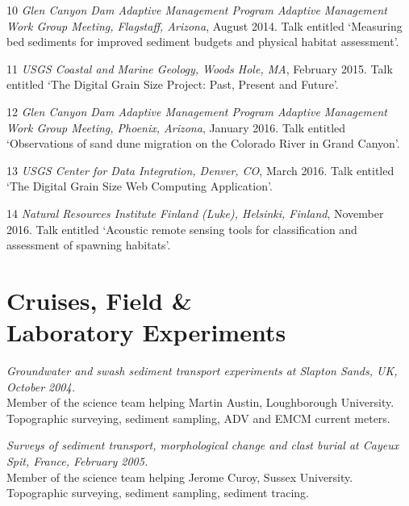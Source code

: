 \documentclass[margin,line]{resume}
\begin{document}
\begin{resume}
\begin{footnotesize}
\begin{list1}
         \item[10] {\sl Glen Canyon Dam Adaptive Management Program Adaptive Management Work Group Meeting, Flagstaff, Arizona}, August 2014. Talk entitled `Measuring bed sediments for improved sediment budgets and physical habitat assessment'. \\
         \item[11] {\sl USGS Coastal and Marine Geology, Woods Hole, MA}, February 2015. Talk entitled `The Digital Grain Size Project: Past, Present and Future'. \\
         \item[12] {\sl Glen Canyon Dam Adaptive Management Program Adaptive Management Work Group Meeting, Phoenix, Arizona}, January 2016. Talk entitled `Observations of sand dune migration on the Colorado River in Grand Canyon'. \\
         \item[13] {\sl USGS Center for Data Integration, Denver, CO}, March 2016. Talk entitled `The Digital Grain Size Web Computing Application'. \\
         \item[14] {\sl Natural Resources Institute Finland (Luke), Helsinki, Finland}, November 2016. Talk entitled `Acoustic remote sensing tools for classification and assessment of spawning habitats'.
 	\end{list1}
        \end{footnotesize}

\newpage
    \section{\mysidestyle Cruises, Field \& \\Laboratory Experiments} 
        \begin{footnotesize}

    {\sl Groundwater and swash sediment transport experiments at Slapton Sands, UK, October 2004.} \\
    Member of the science team helping Martin Austin, Loughborough University. Topographic surveying, sediment sampling, ADV and EMCM current meters.

    {\sl Surveys of sediment transport, morphological change and clast burial at Cayeux Spit, France, February 2005.} \\
    Member of the science team helping Jerome Curoy, Sussex University. Topographic surveying, sediment sampling, sediment tracing.


\end{footnotesize}
\end{resume}
\end{document}
